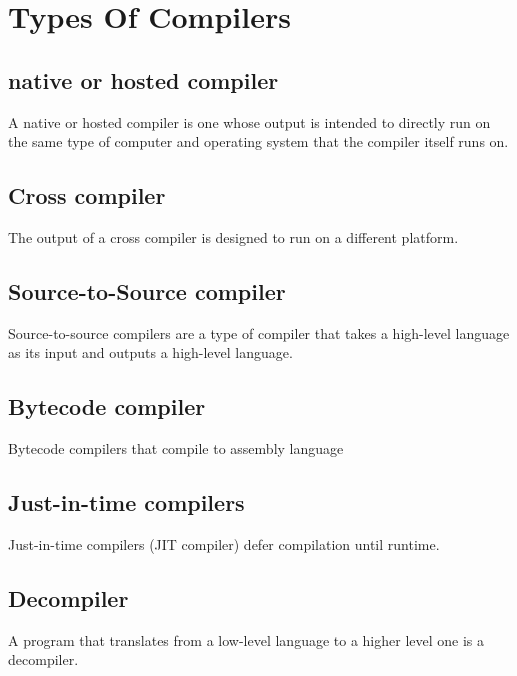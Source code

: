 \documentclass[12pt]{article}
\begin{document}
\section{Types Of Compilers}

\subsection{native or hosted compiler}

A native or hosted compiler is one whose output is intended to directly run on the same type of computer and operating system that the compiler itself runs on.


\subsection{Cross compiler}

The output of a cross compiler is designed to run on a different platform. 

\subsection{Source-to-Source compiler}

Source-to-source compilers are a type of compiler that takes a high-level language as its input and outputs a high-level language.

\subsection{Bytecode compiler}

Bytecode compilers that compile to assembly language


\subsection{Just-in-time compilers}

Just-in-time compilers (JIT compiler) defer compilation until runtime. 


\subsection{Decompiler}

A program that translates from a low-level language to a higher level one is a decompiler.
\end{document}
